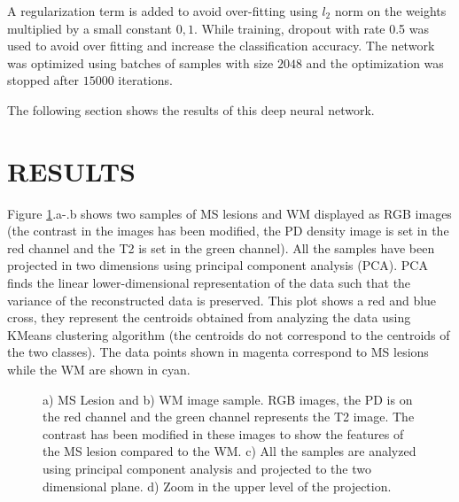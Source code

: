\documentclass[]{spie}  %
\begin{document}
A regularization term is added to avoid over-fitting using $l_2$ norm on the weights multiplied by a small constant $0,1$. 
While training, dropout with rate 0.5 was used to avoid over fitting and increase the classification accuracy. 
The network was optimized using batches of samples with size $2048$ and the optimization was stopped after $15000$ iterations. 

The following section shows the results of this deep neural network. 





\section{RESULTS}

Figure \ref{fig:inputData}.a-.b shows two samples of MS lesions and WM displayed as RGB images (the contrast in the images has been modified, 
the PD density image is set in the red channel and the T2 is set in the green channel).
All the samples have been projected in two dimensions using principal component analysis (PCA). 
PCA finds the linear lower-dimensional representation of the data such that 
the variance of the reconstructed data is preserved. This plot shows a red and blue cross, they represent the centroids 
obtained from analyzing the data using KMeans clustering algorithm\cite{scikit-learn} (the centroids do not correspond to the centroids of the two classes).
The data points shown in magenta correspond to MS lesions while the WM are shown in cyan.

\begin{figure}
	\centering 
	\caption[Input data for the network]{a) MS Lesion and b) WM image sample. RGB images, the PD is on the red channel and the green channel represents the T2 image. The contrast has been modified in these images to show the features of the MS lesion compared to the WM. c) All the samples are analyzed using principal component analysis and projected to the two dimensional plane. d) Zoom in the upper level of the projection.}
	\label{fig:inputData}
\end{figure}
\end{document}
